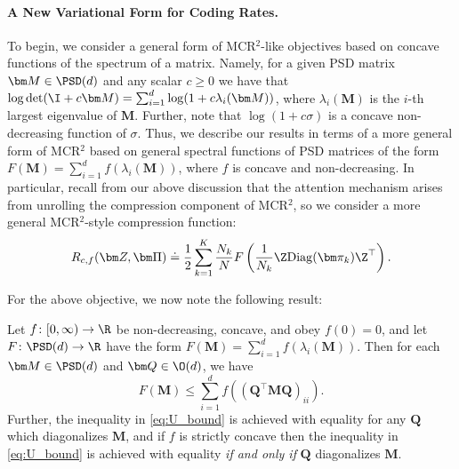 \documentclass[../../book-main.tex]{subfiles}
\begin{document}
\paragraph{A New Variational Form for Coding Rates.} To begin, we consider a general form of MCR$^2$-like objectives based on concave functions of the spectrum of a matrix.  Namely, for a given PSD matrix $\bm M \in \PSD(d)$ and any scalar $c \geq 0$ we have that $\log \det (\I + c \bm M) = \sum_{i=1}^{d} \log( 1 + c \lambda_i(\bm M))$, where $\lambda_i (\bm M)$ is the $i$-th largest eigenvalue of $\bm M$.  Further, note that $\log(1 + c \sigma)$ is a concave non-decreasing function of $\sigma$.  Thus, we describe our results in terms of a more general form of MCR$^2$ based on general spectral functions of PSD matrices of the form $F(\bm M) = \sum_{i=1}^{d} f(\lambda_i(\bm M))$, where $f$ is concave and non-decreasing.  In particular, recall from our above discussion that the attention mechanism arises from unrolling the compression component of MCR$^2$, so we consider a more general MCR$^2$-style compression function:
\vspace{-2mm}
\begin{equation}
    R_{c,f}(\bm Z, \bm \Pi) \doteq \frac{1}{2}\sum_{k=1}^K \frac{N_k}{N} F\left( \frac{1}{N_k}\Z \mathrm{Diag}(\bm \pi_k) \Z^{\top} \right).
    \label{eq:mcr_c_gen}
\end{equation}



For the above objective, we now note the following result:
\begin{theorem}
\label{thm:var_concave}
    Let \(f \colon [0, \infty) \to \R\) be non-decreasing, concave, and obey \(f(0) = 0\), and let \(F \colon \PSD(d) \to \R\) have the form \(F(\bm M) = \sum_{i = 1}^{d}f(\lambda_{i}(\bm M))\). Then for each \(\bm M \in \PSD(d)\) and \(\bm Q \in \O(d)\), we have
    \begin{equation}
        \label{eq:U_bound}
        F(\bm M) \leq  \sum_{i=1}^{d} f\left( (\bm Q^{\top} \bm M \bm Q)_{ii} \right).
    \end{equation}
    Further, the inequality in \eqref{eq:U_bound} is achieved with equality for any $\bm Q$ which diagonalizes $\bm M$, and if $f$ is strictly concave then the inequality in \eqref{eq:U_bound} is achieved with equality \textit{if and only if} $\bm Q$ diagonalizes $\bm M$. 
\end{theorem}
\end{document}
